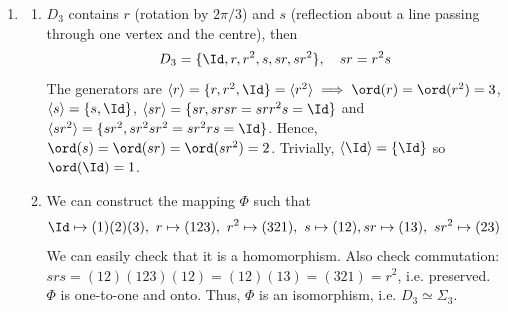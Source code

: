 \documentclass[a4paper]{article}
\begin{document}
\begin{ans}
\begin{enumerate}[label=(\roman*)]
\item 
\begin{enumerate}[label=(\alph*)]
\item $D_3$ contains $r$ (rotation by $2\pi/3$) and $s$ (reflection about a line passing through one vertex and the centre), then 
$$D_3=\{\Id,r,r^2,s,sr,sr^2\},\quad sr=r^2s$$
The generators are $\langle r\rangle=\{r,r^2,\Id\}=\langle r^2\rangle\implies\ord(r)=\ord(r^2)=3$, $\langle s\rangle=\{s,\Id\}$, $\langle sr\rangle=\{sr,srsr=srr^2s=\Id\}$ and $\langle sr^2\rangle=\{sr^2,sr^2sr^2=sr^2rs=\Id\}$. Hence, $\ord(s)=\ord(sr)=\ord(sr^2)=2$. Trivially, $\langle\Id\rangle=\{\Id\}$ so $\ord(\Id)=1$.
\item We can construct the mapping $\Phi$ such that
$$\Id\mapsto(1)(2)(3),~ r\mapsto(123),~r^2\mapsto(321),~s\mapsto(12),sr\mapsto(13),~sr^2\mapsto(23)$$
We can easily check that it is a homomorphism. Also check commutation: $srs=(12)(123)(12)=(12)(13)=(321)=r^2$, i.e. preserved. $\Phi$ is one-to-one and onto. Thus, $\Phi$ is an isomorphism, i.e. $D_3\simeq\Sigma_3$.
\end{enumerate}
\end{enumerate}
\end{ans}
\newpage
\end{document}

